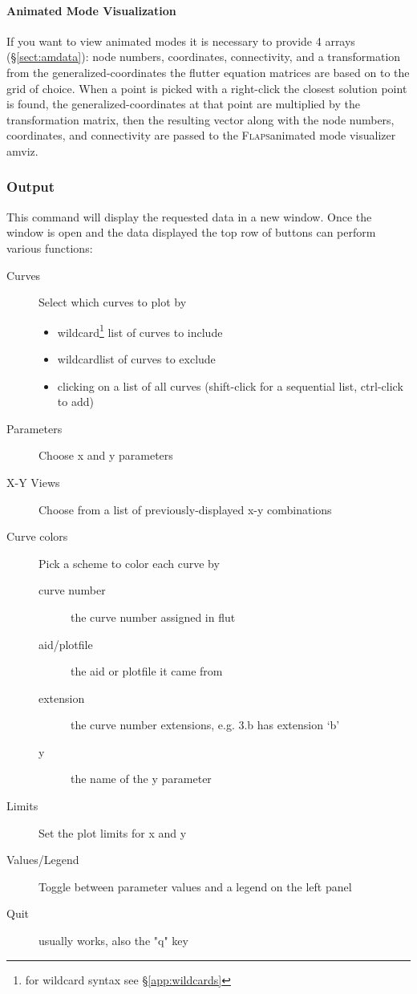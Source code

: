 \documentclass[11pt,openany,twoside]{book}
\numberwithin{equation}{section}		%
\newcommand{\Cmd}[1]{{\sf #1}}
\newcommand{\Flaps}{\textsc{Flaps\:}}
\newcommand{\Sectref}[1]{\S\ref{#1}}
\begin{document}
\paragraph{Animated Mode Visualization}
If you want to view animated modes it is necessary to
provide 4 arrays (\Sectref{sect:amdata}): node numbers, coordinates, connectivity, and
a transformation from the generalized-coordinates the flutter equation matrices are
based on to the grid of choice.
When a point is picked with a right-click the closest solution point
is found, the generalized-coordinates at that point are multiplied
by the transformation matrix, then the resulting vector along with the
node numbers, coordinates, and connectivity are passed to
the \Flaps animated mode visualizer \Cmd{amviz}.
\par

\subsubsection{Output}
This command will display the requested data in a new
window. Once the window is open and the data displayed
the top row of buttons can perform various functions:
\begin{description}
	\item[Curves] Select which curves to plot by
		\begin{itemize}
			\item wildcard\footnote[1]{for wildcard syntax see \Sectref{app:wildcards}}
			list of curves to include
			\item wildcard\footnotemark[1] list of curves to exclude
			\item clicking on a list of all curves (shift-click for a
				sequential list, ctrl-click to add)
		\end{itemize}
	\item[Parameters] Choose x and y parameters
	\item[X-Y Views] Choose from a list of previously-displayed x-y combinations
	\item[Curve colors] Pick a scheme to color each curve by
		\begin{description}
			\item[curve number] the curve number assigned in \Cmd{flut}
			\item[aid/plotfile] the aid or plotfile it came from
			\item[extension] the curve number extensions, e.g. 3.b has extension `b'
			\item[y] the name of the y parameter
		\end{description}
	\item[Limits] Set the plot limits for x and y
	\item[Values/Legend] Toggle between parameter values and a legend on the
		left panel
	\item[Quit] usually works, also the "q" key
\end{description}
\end{document}
